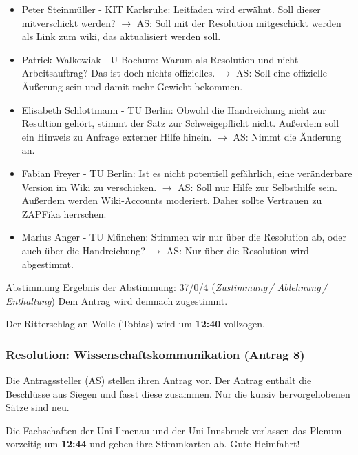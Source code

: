     \begin{itemize}
      \item Peter Steinmüller - KIT Karlsruhe: Leitfaden wird erwähnt. Soll dieser mitverschickt werden?
        $\rightarrow$ AS: Soll mit der Resolution mitgeschickt werden als Link zum wiki, das aktualisiert werden soll.
      \item Patrick Walkowiak - U Bochum: Warum als Resolution und nicht Arbeitsauftrag? Das ist doch nichts offizielles.
        $\rightarrow$ AS: Soll eine offizielle Äußerung sein und damit mehr Gewicht bekommen.
      \item Elisabeth Schlottmann - TU Berlin: Obwohl die Handreichung nicht zur Resultion gehört, stimmt der Satz zur Schweigepflicht nicht. Außerdem soll ein Hinweis zu Anfrage externer Hilfe hinein.
        $\rightarrow$ AS: Nimmt die Änderung an.
      \item Fabian Freyer - TU Berlin: Ist es nicht potentiell gefährlich, eine veränderbare Version im Wiki zu verschicken.
        $\rightarrow$ AS: Soll nur Hilfe zur Selbsthilfe sein. Außerdem werden Wiki-Accounts moderiert. Daher sollte Vertrauen zu ZAPFika herrschen.
      \item Marius Anger - TU München: Stimmen wir nur über die Resolution ab, oder auch über die Handreichung?
        $\rightarrow$ AS: Nur über die Resolution wird abgestimmt.
    \end{itemize}

    \begin{success}{Abstimmung}
      Ergebnis der Abstimmung: 37/0/4 (\textit{Zustimmung\,/ Ablehnung\,/ Enthaltung})
      Dem Antrag wird demnach zugestimmt.
    \end{success}

    Der Ritterschlag an Wolle (Tobias) wird um \textbf{12:40} vollzogen.

  \subsubsection*{Resolution: Wissenschaftskommunikation (Antrag 8)}
    Die Antragssteller (AS) stellen ihren Antrag vor.
    Der Antrag enthält die Beschlüsse aus Siegen und fasst diese zusammen.
    Nur die kursiv hervorgehobenen Sätze sind neu.

    \begin{info}{}
      Die Fachschaften der Uni Ilmenau und der Uni Innsbruck verlassen das Plenum vorzeitig um \textbf{12:44} und geben ihre Stimmkarten ab. Gute Heimfahrt!
    \end{info}

